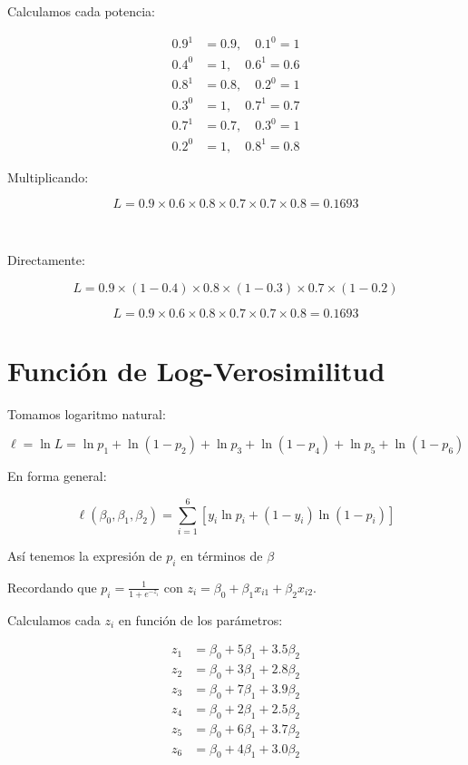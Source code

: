 \documentclass[12pt]{article}
\begin{document}
Calculamos cada potencia:

\begin{align*}
0.9^{1} &= 0.9, \quad 0.1^{0} = 1 \\
0.4^{0} &= 1, \quad 0.6^{1} = 0.6 \\
0.8^{1} &= 0.8, \quad 0.2^{0} = 1 \\
0.3^{0} &= 1, \quad 0.7^{1} = 0.7 \\
0.7^{1} &= 0.7, \quad 0.3^{0} = 1 \\
0.2^{0} &= 1, \quad 0.8^{1} = 0.8
\end{align*}

Multiplicando:

\[
L = 0.9 \times 0.6 \times 0.8 \times 0.7 \times 0.7 \times 0.8 = 0.1693
\]

\

Directamente:

\[
L = 0.9 \times (1-0.4) \times 0.8 \times (1-0.3) \times 0.7 \times (1-0.2)
\]

\[
L = 0.9 \times 0.6 \times 0.8 \times 0.7 \times 0.7 \times 0.8 = 0.1693
\]


\section{Función de Log-Verosimilitud}

Tomamos logaritmo natural:

\[
\ell = \ln L = \ln p_1 + \ln(1-p_2) + \ln p_3 + \ln(1-p_4) + \ln p_5 + \ln(1-p_6)
\]

En forma general:

\[
\ell(\beta_0, \beta_1, \beta_2) = \sum_{i=1}^{6} \left[ y_i \ln p_i + (1-y_i) \ln(1-p_i) \right]
\]

Así tenemos la expresión de $p_i$ en términos de $\beta$

Recordando que $p_i = \frac{1}{1+e^{-z_i}}$ con $z_i = \beta_0 + \beta_1 x_{i1} + \beta_2 x_{i2}$.

Calculamos cada $z_i$ en función de los parámetros:

\[
\begin{aligned}
z_1 &= \beta_0 + 5\beta_1 + 3.5\beta_2 \\
z_2 &= \beta_0 + 3\beta_1 + 2.8\beta_2 \\
z_3 &= \beta_0 + 7\beta_1 + 3.9\beta_2 \\
z_4 &= \beta_0 + 2\beta_1 + 2.5\beta_2 \\
z_5 &= \beta_0 + 6\beta_1 + 3.7\beta_2 \\
z_6 &= \beta_0 + 4\beta_1 + 3.0\beta_2
\end{aligned}
\]
\end{document}
